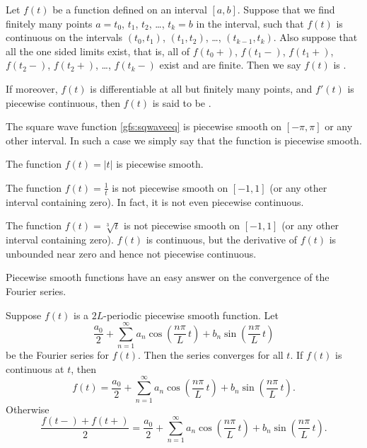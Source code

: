 Let $f(t)$ be a function defined on an interval $[a,b]$.  Suppose
that we find finitely many points
$a=t_0$, $t_1$, $t_2$, \ldots, $t_k=b$ in
the interval, such that $f(t)$ is continuous
on the intervals
$(t_0,t_1)$, 
$(t_1,t_2)$, \ldots, 
$(t_{k-1},t_k)$.
Also suppose that all the one sided limits exist, that is,
all of
$f(t_0+)$,
$f(t_1-)$,
$f(t_1+)$,
$f(t_2-)$,
$f(t_2+)$,
\ldots,
$f(t_k-)$
exist and are finite.
Then
we say $f(t)$ is \emph{}.

If moreover, $f(t)$ is differentiable at all but finitely many points,
and $f'(t)$ is piecewise continuous, then 
$f(t)$ is said to be \emph{}.

\begin{example}
The square wave function \eqref{gfs:sqwaveeq}
is piecewise smooth on $[-\pi,\pi]$ or any other interval.  In such a
case we simply say that the function is piecewise smooth.
\end{example}

\begin{example}
The function $f(t) = \lvert t \lvert$
is piecewise smooth.
\end{example}

\begin{example}
The function $f(t) = \frac{1}{t}$ is not piecewise smooth on
$[-1,1]$ (or any other interval containing zero).  In fact, it is not
even piecewise continuous.
\end{example}

\begin{example}
The function $f(t) = \sqrt[3]{t}$ is not piecewise smooth on
$[-1,1]$ (or any other interval containing zero).  $f(t)$ is continuous, but
the derivative of $f(t)$ is unbounded near zero and hence not piecewise
continuous.
\end{example}

Piecewise smooth functions have an easy answer on the convergence
of the Fourier series.

\begin{theorem}
Suppose $f(t)$ is a $2L$-periodic piecewise smooth function.
Let
\begin{equation*}
\frac{a_0}{2} + \sum_{n=1}^\infty a_n \cos \left( \frac{n \pi}{L} \, t
\right)
+ b_n \sin \left( \frac{n \pi}{L} \, t \right)
\end{equation*}
be the Fourier series for $f(t)$.  Then the series converges
for all $t$.  If $f(t)$ is continuous
at $t$, then
\begin{equation*}
f(t) = \frac{a_0}{2} + \sum_{n=1}^\infty
a_n \cos \left( \frac{n \pi}{L} \, t \right)
+ b_n \sin \left( \frac{n \pi}{L} \, t \right) .
\end{equation*}
Otherwise
\begin{equation*}
\frac{f(t-)+f(t+)}{2} =
\frac{a_0}{2} + \sum_{n=1}^\infty a_n \cos \left( \frac{n \pi}{L} \, t
\right)
+ b_n \sin \left( \frac{n \pi}{L} \, t \right) .
\end{equation*}
\end{theorem}


